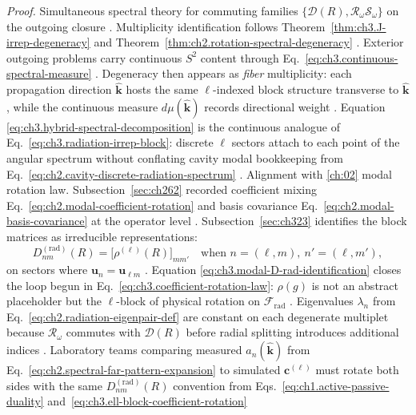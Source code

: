 \noindent\textit{Proof.}
Simultaneous spectral theory for commuting families \(\{\mathcal{D}(R),\mathcal{R}_\omega\mathcal{S}_\omega\}\)
on the outgoing closure \cite{kato1995}. Multiplicity identification follows
Theorem~\ref{thm:ch3.J-irrep-degeneracy} and Theorem~\ref{thm:ch2.rotation-spectral-degeneracy}
\cite{harrington2001}.
Exterior outgoing problems carry continuous \(S^{2}\) content through
Eq.~\eqref{eq:ch3.continuous-spectral-measure} \cite{stratton1941}. Degeneracy then
appears as \emph{fiber} multiplicity: each propagation direction \(\hat{\mathbf{k}}\) hosts the same
\(\ell\)-indexed block structure transverse to \(\hat{\mathbf{k}}\), while the continuous measure
\(d\mu(\hat{\mathbf{k}})\) records directional weight \cite{hansen1988}. Equation
\eqref{eq:ch3.hybrid-spectral-decomposition} is the continuous analogue of
Eq.~\eqref{eq:ch3.radiation-irrep-block}: discrete \(\ell\) sectors attach to each point of the
angular spectrum without conflating cavity modal bookkeeping from
Eq.~\eqref{eq:ch2.cavity-discrete-radiation-spectrum} \cite{harrington2001}.
Alignment with \ref{ch:02} modal rotation law. Subsection~\ref{sec:ch262} recorded coefficient mixing
Eq.~\eqref{eq:ch2.modal-coefficient-rotation} and basis covariance
Eq.~\eqref{eq:ch2.modal-basis-covariance} at the operator level \cite{stratton1941}.
Subsection~\ref{sec:ch323} identifies the block matrices as irreducible representations:
\begin{equation}
\label{eq:ch3.modal-D-rad-identification}
D^{(\mathrm{rad})}_{nm}(R)
=
\big[\rho^{(\ell)}(R)\big]_{mm'}
\quad\text{when }n=(\ell,m),\ n'=(\ell,m'),
\end{equation}
on sectors where \(\mathbf{u}_n=\mathbf{u}_{\ell m}\) \cite{hansen1988}. Equation
\eqref{eq:ch3.modal-D-rad-identification} closes the loop begun in
Eq.~\eqref{eq:ch3.coefficient-rotation-law}: \(\rho(g)\) is not an abstract placeholder but the
\(\ell\)-block of physical rotation on \(\mathcal{F}_{\mathrm{rad}}\) \cite{stratton1941}. Eigenvalues
\(\lambda_n\) from Eq.~\eqref{eq:ch2.radiation-eigenpair-def} are constant on each degenerate multiplet
because \(\mathcal{R}_\omega\) commutes with \(\mathcal{D}(R)\) before radial splitting introduces additional
indices \cite{harrington2001}. Laboratory teams comparing measured \(a_n(\hat{\mathbf{k}})\) from
Eq.~\eqref{eq:ch2.spectral-far-pattern-expansion} to simulated \(\mathbf{c}^{(\ell)}\) must rotate both sides
with the same \(D^{(\mathrm{rad})}_{nm}(R)\) convention from
Eqs.~\eqref{eq:ch1.active-passive-duality} and~\eqref{eq:ch3.ell-block-coefficient-rotation}
